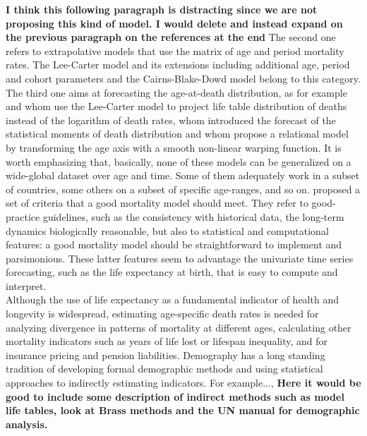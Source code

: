 \documentclass[a4,11pt]{article}
\begin{document}
\textbf{I think this following paragraph is distracting since we are not proposing this kind of model. I would delete and instead expand on the previous paragraph on the references at the end}
The second one refers to extrapolative models that use the matrix of age and period mortality rates. The Lee-Carter model \citep{LC1992} and its extensions including additional age, period and cohort parameters and the Cairns-Blake-Dowd model \citep{CBD2006} belong to this category.
The third one aims at forecasting the age-at-death distribution, as for example \cite{Oeppen08} and \cite{Bergeron} whom use the Lee-Carter model to project life table distribution of deaths instead of the logarithm of death rates, \cite{Pascariu19} whom introduced the forecast of the statistical moments of death distribution and \cite{BaselliniCamarda} whom propose a relational model by transforming the age axis with a smooth non-linear warping function. It is worth emphasizing that, basically, none of these models can be generalized on a wide-global dataset over age and time. Some of them adequately work in a subset of countries, some others on a subset of specific age-ranges, and so on. \cite{Cairns} proposed a set of criteria that a good mortality model should meet. They refer to good-practice guidelines, such as the consistency with historical data, the long-term dynamics biologically reasonable, but also to statistical and computational features: a good mortality model should be straightforward to implement and parsimonious. These latter features seem to advantage the univariate time series forecasting, such as the life expectancy at birth, that is easy to compute and interpret.\\ 

Although the use of life expectancy as a fundamental indicator of health and longevity is widespread, estimating age-specific death rates is needed for analyzing divergence in patterns of mortality at different ages, calculating other mortality indicators such as years of life lost or lifespan inequality, and for insurance pricing and pension liabilities. Demography has a long standing tradition of developing formal demographic methods and using statistical approaches to indirectly estimating indicators. For example..., \textbf{Here it would be good to include some description of indirect methods such as model life tables, look at Brass methods and the UN manual for demographic analysis.}\\
\end{document}
